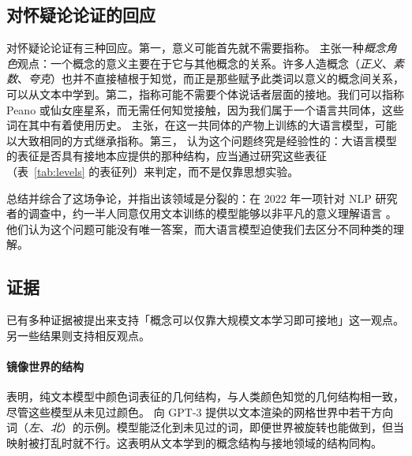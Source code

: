 \subsection{对怀疑论论证的回应}
对怀疑论论证有三种回应。第一，意义可能首先就不需要指称。\citet{piantadosi2022meaning} 主张一种\emph{概念角色}观点：一个概念的意义主要在于它与其他概念的关系。许多人造概念（{\em 正义}、{\em 素数}、{\em 夸克}）也并不直接植根于知觉，而正是那些赋予此类词以意义的概念间关系，可以从文本中学到。第二，指称可能不需要个体说话者层面的接地。我们可以指称 Peano 或仙女座星系，而无需任何知觉接触，因为我们属于一个语言共同体，这些词在其中有着使用历史。\citet{mandelkern2024language} 主张，在这一共同体的产物上训练的大语言模型，可能以大致相同的方式继承指称。第三，\citet{pavlick2023symbols} 认为这个问题终究是经验性的：大语言模型的表征是否具有接地本应提供的那种结构，应当通过研究这些表征（表~\ref{tab:levels} 的表征列）来判定，而不是仅靠思想实验。

\citet{mitchell2023debate} 总结并综合了这场争论，并指出该领域是分裂的：在 2022 年一项针对 NLP 研究者的调查中，约一半人同意仅用文本训练的模型能够以非平凡的意义理解语言 \citep{michael2022what}。他们认为这个问题可能没有唯一答案，而大语言模型迫使我们去区分不同种类的理解。

\subsection{证据}
已有多种证据被提出来支持「概念可以仅靠大规模文本学习即可接地」这一观点。另一些结果则支持相反观点。

\paragraph{镜像世界的结构}
\citet{abdou2021language} 表明，纯文本模型中颜色词表征的几何结构，与人类颜色知觉的几何结构相一致，尽管这些模型从未见过颜色。\citet{patel2022mapping} 向 GPT-3 提供以文本渲染的网格世界中若干方向词（{\em 左}、{\em 北}）的示例。模型能泛化到未见过的词，即便世界被旋转也能做到，但当映射被打乱时就不行。这表明从文本学到的概念结构与接地领域的结构同构。

